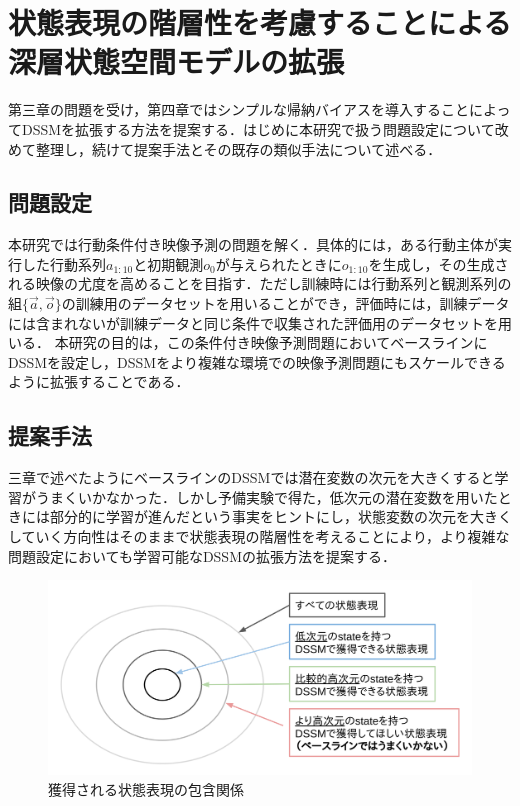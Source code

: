 \chapter{状態表現の階層性を考慮することによる深層状態空間モデルの拡張}
\label{chap:proposal}

第三章の問題を受け，第四章ではシンプルな帰納バイアスを導入することによってDSSMを拡張する方法を提案する．はじめに本研究で扱う問題設定について改めて整理し，続けて提案手法とその既存の類似手法について述べる．

\section{問題設定}

本研究では行動条件付き映像予測の問題を解く．具体的には，ある行動主体が実行した行動系列$a_{1:10}$と初期観測$o_0$が与えられたときに$o_{1:10}$を生成し，その生成される映像の尤度を高めることを目指す．ただし訓練時には行動系列と観測系列の組$\{\vec{a}, \vec{o}\}$の訓練用のデータセットを用いることができ，評価時には，訓練データには含まれないが訓練データと同じ条件で収集された評価用のデータセットを用いる．
本研究の目的は，この条件付き映像予測問題においてベースラインにDSSMを設定し，DSSMをより複雑な環境での映像予測問題にもスケールできるように拡張することである．

\section{提案手法}
三章で述べたようにベースラインのDSSMでは潜在変数の次元を大きくすると学習がうまくいかなかった．しかし予備実験で得た，低次元の潜在変数を用いたときには部分的に学習が進んだという事実をヒントにし，状態変数の次元を大きくしていく方向性はそのままで状態表現の階層性を考えることにより，より複雑な問題設定においても学習可能なDSSMの拡張方法を提案する．

\begin{figure}[tp]
  \begin{center}
    \includegraphics[width=\linewidth]{./figures/hierarchical.png}
    \caption{獲得される状態表現の包含関係}
    \label{fig:hierarchical}
  \end{center}
\end{figure}

